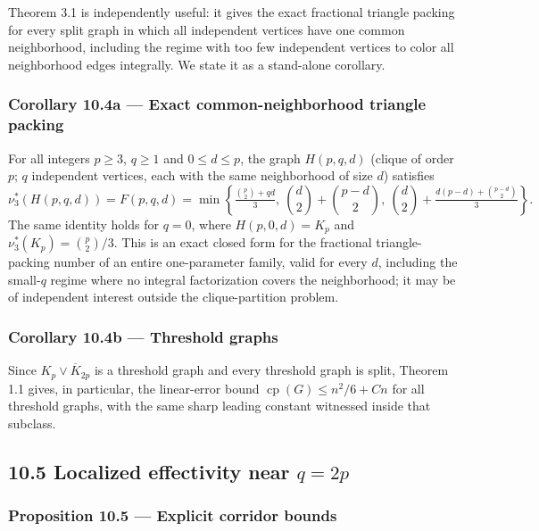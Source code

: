 \documentclass[
  11pt,
]{article}
\begin{document}
Theorem 3.1 is independently useful: it gives the exact fractional triangle packing for every split graph in which all independent vertices have one common neighborhood, including the regime with too few independent vertices to color all neighborhood edges integrally. We state it as a stand-alone corollary.

\subsubsection{Corollary 10.4a --- Exact common-neighborhood triangle packing}\label{corollary-10.4a-exact-common-neighborhood-triangle-packing}

For all integers \(p\ge3\), \(q\ge1\) and \(0\le d\le p\), the graph \(H(p,q,d)\)
(clique of order \(p\); \(q\) independent vertices, each with the same neighborhood of size
\(d\)) satisfies
\[
\nu_3^*(H(p,q,d))=F(p,q,d)=\min\left\{\tfrac{\binom p2+qd}{3},\ \binom d2+\binom{p-d}2,\ \binom d2+\tfrac{d(p-d)+\binom{p-d}2}{3}\right\}.
\]
The same identity holds for \(q=0\), where \(H(p,0,d)=K_p\) and \(\nu_3^*(K_p)=\binom p2/3\). This is an exact closed form for the fractional triangle-packing number of an entire one-parameter family, valid for every \(d\), including the small-\(q\) regime where no integral factorization covers the neighborhood; it may be of independent interest outside the clique-partition problem.

\subsubsection{Corollary 10.4b --- Threshold graphs}\label{corollary-10.4b-threshold-graphs}

Since \(K_p\vee\overline K_{2p}\) is a threshold graph and every threshold graph is split,
Theorem 1.1 gives, in particular, the linear-error bound \(\operatorname{cp}(G)\le n^2/6+Cn\)
for all threshold graphs, with the same sharp leading constant witnessed inside that subclass.

\subsection{\texorpdfstring{10.5 Localized effectivity near \(q=2p\)}{10.5 Localized effectivity near q=2p}}\label{localized-effectivity-near-q2p}

\subsubsection{Proposition 10.5 --- Explicit corridor bounds}\label{proposition-10.5-explicit-corridor-bounds}
\end{document}
